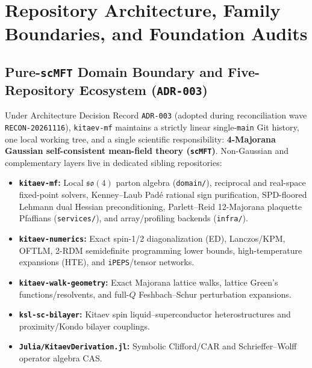 
\chapter{Repository Architecture, Family Boundaries, and Foundation Audits}
\label{app:architecture_foundations}

\section{Pure-\texttt{scMFT} Domain Boundary and Five-Repository Ecosystem (\texttt{ADR-003})}
\label{sec:app_family_boundaries}

Under Architecture Decision Record \texttt{ADR-003} (adopted during reconciliation wave \texttt{RECON-20261116}), \texttt{kitaev-mf} maintains a strictly linear single-\texttt{main} Git history, one local working tree, and a single scientific responsibility: \textbf{4-Majorana Gaussian self-consistent mean-field theory (\texttt{scMFT})}. Non-Gaussian and complementary layers live in dedicated sibling repositories:
\begin{itemize}
\item \textbf{\texttt{kitaev-mf}:} Local $\mathfrak{so}(4)$ parton algebra (\texttt{domain/}), reciprocal and real-space fixed-point solvers, Kenney--Laub Pad\'e rational sign purification, SPD-floored Lehmann dual Hessian preconditioning, Parlett--Reid 12-Majorana plaquette Pfaffians (\texttt{services/}), and array/profiling backends (\texttt{infra/}).
\item \textbf{\texttt{kitaev-numerics}:} Exact spin-1/2 diagonalization (ED), Lanczos/KPM, OFTLM, 2-RDM semidefinite programming lower bounds, high-temperature expansions (HTE), and \texttt{iPEPS}/tensor networks.
\item \textbf{\texttt{kitaev-walk-geometry}:} Exact Majorana lattice walks, lattice Green's functions/resolvents, and full-$Q$ Feshbach--Schur perturbation expansions.
\item \textbf{\texttt{ksl-sc-bilayer}:} Kitaev spin liquid--superconductor heterostructures and proximity/Kondo bilayer couplings.
\item \textbf{\texttt{Julia/KitaevDerivation.jl}:} Symbolic Clifford/CAR and Schrieffer--Wolff operator algebra CAS.
\end{itemize}

